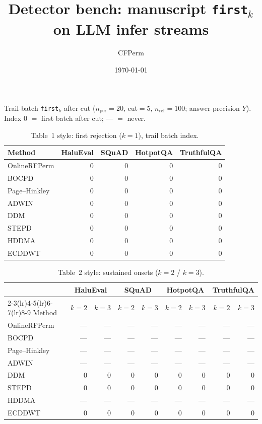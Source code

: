 \documentclass[11pt]{article}
\title{Detector bench: manuscript \texttt{first}$_k$ on LLM infer streams}
\author{CFPerm}
\date{\today}
\begin{document}
\maketitle

\noindent
Trail-batch \texttt{first}$_k$ after cut
($n_{\mathrm{per}}=20$, cut$=5$, $n_{\mathrm{ref}}=100$; answer-precision $Y$).
Index $0$ $=$ first batch after cut; --- $=$ never.

\begin{table}[h]
\centering
\small
\caption{Table~1 style: first rejection ($k{=}1$), trail batch index.}
\begin{tabular}{lrrrr}
\toprule
Method & HaluEval & SQuAD & HotpotQA & TruthfulQA \\
\midrule
OnlineRFPerm  & 0 & 0 & 0 & 0 \\
BOCPD         & 0 & 0 & 0 & 0 \\
Page--Hinkley & 0 & 0 & 0 & 0 \\
ADWIN         & 0 & 0 & 0 & 0 \\
DDM           & 0 & 0 & 0 & 0 \\
STEPD         & 0 & 0 & 0 & 0 \\
HDDMA         & 0 & 0 & 0 & 0 \\
ECDDWT        & 0 & 0 & 0 & 0 \\
\bottomrule
\end{tabular}
\end{table}

\begin{table}[h]
\centering
\small
\caption{Table~2 style: sustained onsets ($k{=}2$ / $k{=}3$).}
\begin{tabular}{lrrrrrrrr}
\toprule
 & \multicolumn{2}{c}{HaluEval} & \multicolumn{2}{c}{SQuAD}
 & \multicolumn{2}{c}{HotpotQA} & \multicolumn{2}{c}{TruthfulQA} \\
\cmidrule(lr){2-3}\cmidrule(lr){4-5}\cmidrule(lr){6-7}\cmidrule(lr){8-9}
Method & $k{=}2$ & $k{=}3$ & $k{=}2$ & $k{=}3$
 & $k{=}2$ & $k{=}3$ & $k{=}2$ & $k{=}3$ \\
\midrule
OnlineRFPerm  & --- & --- & --- & --- & --- & --- & --- & --- \\
BOCPD         & --- & --- & --- & --- & --- & --- & --- & --- \\
Page--Hinkley & --- & --- & --- & --- & --- & --- & --- & --- \\
ADWIN         & --- & --- & --- & --- & --- & --- & --- & --- \\
DDM           & 0   & 0   & 0   & 0   & 0   & 0   & 0   & 0   \\
STEPD         & 0   & 0   & 0   & 0   & 0   & 0   & 0   & 0   \\
HDDMA         & --- & --- & --- & --- & --- & --- & --- & --- \\
ECDDWT        & 0   & 0   & 0   & 0   & 0   & 0   & 0   & 0   \\
\bottomrule
\end{tabular}
\end{table}
\end{document}
